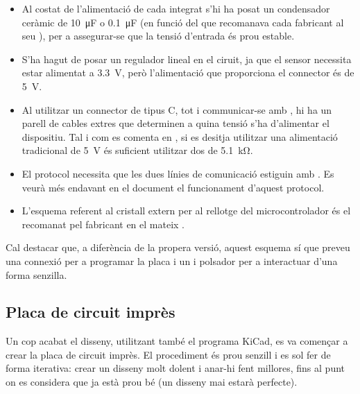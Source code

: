 \begin{itemize}
    \item Al costat de l'alimentació de cada integrat s'hi ha posat un
    condensador ceràmic de
    \SI[round-mode=places,round-precision=0]{10}{\micro\farad} o
    \SI[round-mode=places,round-precision=1]{0.1}{\micro\farad}
    (en funció del que recomanava
    cada fabricant al seu ), per a assegurar-se que la tensió
    d'entrada és prou estable.
    \item S'ha hagut de posar un regulador lineal en el ciruit, ja que el
    sensor necessita estar alimentat a
    \SI[round-mode=places,round-precision=1]{3.3}{\volt},
    però l'alimentació que proporciona
    el connector  és de \SI[round-mode=places,round-precision=0]{5}{\volt}.
    \item Al utilitzar un connector de tipus C, tot i communicar-se amb
    , hi ha un parell de cables extres que determinen a quina tensió
    s'ha d'alimentar el dispositiu. Tal i com es comenta en \cite{Axelson2015USB},
    si es desitja utilitzar una alimentació tradicional de 
    \SI[round-mode=places,round-precision=0]{5}{\volt} és suficient
    utilitzar dos  de
    \SI[round-mode=places,round-precision=1]{5.1}{\kilo\ohm}.
    \item El protocol  necessita que les dues línies de comunicació
    estiguin amb . Es veurà més endavant en el document el
    funcionament d'aquest protocol.
    \item L'esquema referent al cristall extern per al rellotge del microcontrolador
    és el recomanat pel fabricant en el mateix  \cite{AtMega32u4}.
\end{itemize}

Cal destacar que, a diferència de la propera versió, aquest esquema sí que preveu
una connexió  per a programar la placa i un  i polsador per
a interactuar d'una forma senzilla.

\subsection{Placa de circuit imprès}

Un cop acabat el disseny, utilitzant també el programa KiCad, es va començar a
crear la placa de circuit imprès. El procediment és prou senzill i es sol fer
de forma iterativa: crear un disseny molt dolent i anar-hi fent millores, fins
al punt on es considera que ja està prou bé (un disseny mai estarà perfecte).

